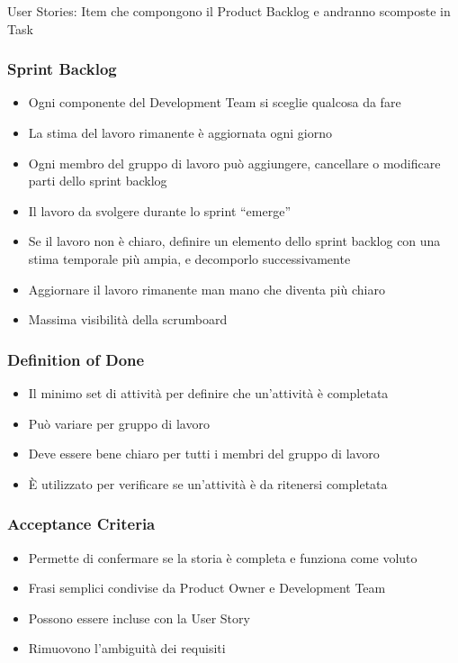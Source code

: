 \begin{mdframed}
    User Stories: Item che compongono il Product Backlog e andranno scomposte in Task
\end{mdframed}

\subsubsection{Sprint Backlog}
\begin{itemize}
    \item Ogni componente del Development Team si sceglie qualcosa da fare
    \item La stima del lavoro rimanente è aggiornata ogni giorno
    \item Ogni membro del gruppo di lavoro può aggiungere, cancellare o modificare parti dello sprint backlog
    \item Il lavoro da svolgere durante lo sprint “emerge”
    \item Se il lavoro non è chiaro, definire un elemento dello sprint backlog con una stima temporale più ampia, e decomporlo successivamente
    \item Aggiornare il lavoro rimanente man mano che diventa più chiaro
    \item Massima visibilità della scrumboard
\end{itemize}

\subsubsection{Definition of Done}
\begin{itemize}
    \item Il minimo set di attività per definire che un'attività è completata
    \item Può variare per gruppo di lavoro
    \item Deve essere bene chiaro per tutti i membri del gruppo di lavoro
    \item È utilizzato per verificare se un'attività è da ritenersi completata
\end{itemize}

\subsubsection{Acceptance Criteria}
\begin{itemize}
    \item Permette di confermare se la storia è completa e funziona come voluto
    \item Frasi semplici condivise da Product Owner e Development Team
    \item Possono essere incluse con la User Story
    \item Rimuovono l'ambiguità dei requisiti
\end{itemize}

\newpage